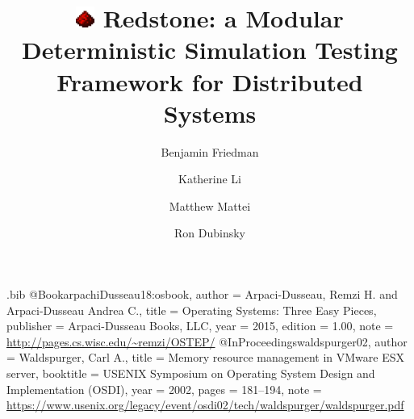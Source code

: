 \usepackage{filecontents}

\usepackage{setspace}
\linespread{1.25}

\begin{filecontents}{\jobname.bib}
@Book{arpachiDusseau18:osbook,
author =       {Arpaci-Dusseau, Remzi H. and Arpaci-Dusseau Andrea C.},
title =        {Operating Systems: Three Easy Pieces},
publisher =    {Arpaci-Dusseau Books, LLC},
year =         2015,
edition =      {1.00},
note =         {\url{http://pages.cs.wisc.edu/~remzi/OSTEP/}}
}
@InProceedings{waldspurger02,
author =       {Waldspurger, Carl A.},
title =        {Memory resource management in {VMware ESX} server},
booktitle =    {USENIX Symposium on Operating System Design and
Implementation (OSDI)},
year =         2002,
pages =        {181--194},
note =         {\url{https://www.usenix.org/legacy/event/osdi02/tech/waldspurger/waldspurger.pdf}}}
\end{filecontents}

\newcommand{\vrsdust}[1]{\includegraphics[height=#1]{redstone_dust.png}}

\newcommand{\txtrsdust}{\vrsdust{0.55cm} \hspace{0.1in}}




\date{}

\title{\Large \bf \vrsdust{0.7cm} \hspace{0.1in} Redstone: a Modular Deterministic Simulation Testing Framework for Distributed Systems}

\author{
{\rm Benjamin Friedman}\\
\and
{\rm Katherine Li}\\
\and
{\rm Matthew Mattei}\\
\and
{\rm Ron Dubinsky}\\
} %

